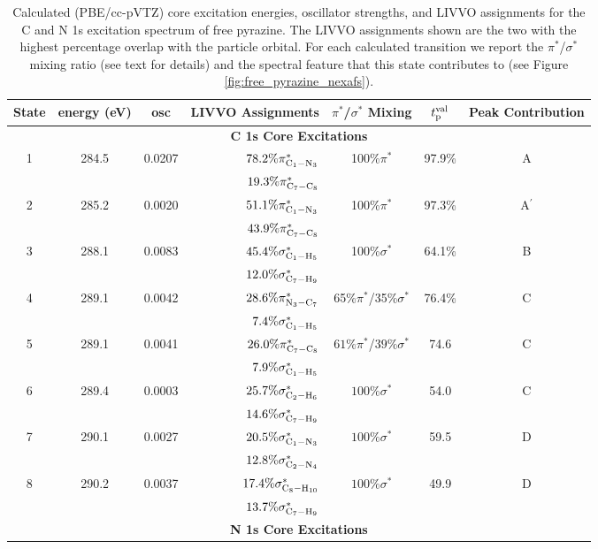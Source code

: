 \documentclass{article}
\begin{document}
\begin{table}[t!]
\centering
\footnotesize
\caption{Calculated (PBE/cc-pVTZ) core excitation energies, oscillator strengths, and LIVVO assignments for the C and N 1s excitation spectrum of free pyrazine. The LIVVO assignments shown are the two with the highest percentage overlap with the particle orbital. For each calculated transition we report the $\pi^*$/$\sigma^*$ mixing ratio (see text for details) and the spectral feature that this state contributes to (see Figure \ref{fig:free_pyrazine_nexafs}). }
\begin{tabular}{cccrccc}
\hline
\hline
State & energy (eV) & osc & LIVVO Assignments & $\pi^*$/$\sigma^*$ Mixing & $t_{\rm p}^{\rm val}$ & Peak Contribution \\
\hline
\multicolumn{7}{c}{\bf C 1s Core Excitations} \\
1 & 284.5 & 0.0207 &  $78.2\%\pi^*_{\rm C_1-N_3} $ & 100\%$\pi^*$ & 97.9\% & A \\
& & & $19.3\%\pi^*_{\rm C_7-C_8}$ & & \\
2 & 285.2 & 0.0020 & $51.1\%\pi^*_{\rm C_1-N_3}$ & 100\%$\pi^*$ & 97.3\% & A$^{\prime}$ \\
& & & $43.9\%\pi^*_{\rm C_7-C_8}$ & & \\
3 & 288.1 & 0.0083 & $45.4\%\sigma^*_{\rm C_1-H_5}$ & 100\%$\sigma^*$ & 64.1\% & B \\
& & & $12.0\%\sigma^*_{\rm C_7-H_9}$ & & \\
4 & 289.1 & 0.0042 & $28.6\%\pi^*_{\rm N_3-C_7}$ & 65\%$\pi^*$/35\%$\sigma^*$ & 76.4\% & C\\
& & & $7.4\%\sigma^*_{\rm C_1-H_5}$ & & \\
5 & 289.1 & 0.0041 & $26.0\%\pi^*_{\rm C_7-C_8}$ & $61\%\pi^*$/$39\%\sigma^*$ & 74.6 & C \\
& & & $7.9\%\sigma^*_{\rm C_1-H_{5}}$ & & \\
6 & 289.4 & 0.0003 & $25.7\%\sigma^*_{\rm C_2-H_6}$ & $100\%\sigma^*$ & 54.0 & C \\
& & & $14.6\%\sigma^*_{\rm C_7-H_{9}}$ & & \\
7 & 290.1 & 0.0027 & $20.5\%\sigma^*_{\rm C_1-N_3}$ & $100\%\sigma^*$ & 59.5 & D \\
& & & $12.8\%\sigma^*_{\rm C_2-N_4}$ & & \\
8 & 290.2 & 0.0037 & $17.4\%\sigma^*_{\rm C_8-H_{10}}$ & $100\%\sigma^*$ & 49.9 & D \\
& & & $13.7\%\sigma^*_{\rm C_7-H_9}$ & & \\
\multicolumn{7}{c}{\bf N 1s Core Excitations} \\

\end{tabular}
\end{table}
\end{document}
